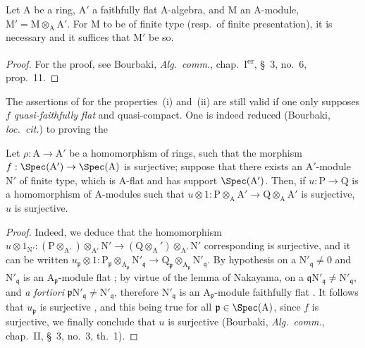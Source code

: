 \begin{lemma}[2.5.3]
\label{IV.2.5.3}
Let $\mathrm{A}$ be a ring, $\mathrm{A}'$ a faithfully flat $\mathrm{A}$-algebra, and $\mathrm{M}$ an
$\mathrm{A}$-module, $\mathrm{M}'=\mathrm{M}\otimes_{\mathrm{A}}\mathrm{A}'$. For $\mathrm{M}$ to be of finite type \textnormal{(}resp.\ of finite presentation\textnormal{)}, it is necessary and
it suffices that $\mathrm{M}'$ be so.
\end{lemma}

\begin{proof}
For the proof, see Bourbaki, \emph{Alg.\ comm.}, chap.~I\textsuperscript{er}, \S~3, no.~6, prop.~11.
\end{proof}

\begin{remark}[2.5.4]
\label{IV.2.5.4}
The assertions of  for the properties~(i) and~(ii) are still valid if one
only supposes $f$ \emph{quasi-faithfully flat}  and quasi-compact. One is indeed reduced (Bourbaki, \emph{loc.\ cit.}) to
proving the
\end{remark}

\begin{lemma}[2.5.4.1]
\label{IV.2.5.4.1}
Let $\rho:\mathrm{A}\to\mathrm{A}'$ be a homomorphism of rings, such that the morphism
$f:\Spec(\mathrm{A}')\to\Spec(\mathrm{A})$ is surjective; suppose that there exists an $\mathrm{A}'$-module $\mathrm{N}'$ of finite type, which is $\mathrm{A}$-flat and has support
$\Spec(\mathrm{A}')$. Then, if $u:\mathrm{P}\to\mathrm{Q}$ is a homomorphism of $\mathrm{A}$-modules such that $u\otimes 1:\mathrm{P}\otimes_{\mathrm{A}}\mathrm{A}'\to\mathrm{Q}\otimes_{\mathrm{A}}\mathrm{A}'$ is surjective, $u$ is
surjective.
\end{lemma}

\begin{proof}
Indeed, we deduce that the homomorphism $u\otimes 1_{\mathrm{N}'}:(\mathrm{P}\otimes_{\mathrm{A}'}){\otimes}_{\mathrm{A}'}\mathrm{N}'\to(\mathrm{Q}\otimes_{\mathrm{A}}')\otimes_{\mathrm{A}'}\mathrm{N}'$ corresponding is
surjective, and it can be written $u_\mathfrak{p}\otimes 1:\mathrm{P}_\mathfrak{p}\otimes_{\mathrm{A}_\mathfrak{p}}\mathrm{N}'_\mathfrak{q}\to\mathrm{Q}_\mathfrak{p}\otimes_{\mathrm{A}_\mathfrak{p}}\mathrm{N}'_\mathfrak{q}$. By hypothesis on a $\mathrm{N}'_\mathfrak{q}\neq 0$ and $\mathrm{N}'_\mathfrak{q}$ is an $\mathrm{A}_\mathfrak{p}$-module
flat ; by virtue of the lemma of Nakayama, on a $\mathfrak{q}\mathrm{N}'_\mathfrak{q}\neq\mathrm{N}'_\mathfrak{q}$, and \emph{a fortiori} $\mathfrak{p}\mathrm{N}'_\mathfrak{q}\neq\mathrm{N}'_\mathfrak{q}$, therefore $\mathrm{N}'_\mathfrak{q}$ is an $\mathrm{A}_\mathfrak{p}$-module
faithfully flat . It follows that $u_\mathfrak{p}$ is surjective , and this being true for all $\mathfrak{p}\in\Spec(\mathrm{A})$,
since $f$ is surjective, we finally conclude that $u$ is surjective (Bourbaki, \emph{Alg.\ comm.}, chap.~II, \S~3, no.~3, th.~1).
\end{proof}

